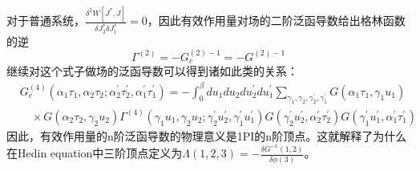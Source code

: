 \documentclass[10pt,openany]{book}
\theoremstyle{thmstyle} %
\theoremstyle{defstyle} %
\theoremstyle{prostyle} %
\begin{document}
对于普通系统，$ \frac{\delta^2 W\left[J^*, J\right]}{\delta J_3^* \delta J_1^*}=0 $，因此有效作用量对场的二阶泛函导数给出格林函数的逆
\begin{equation}
  \Gamma^{(2)}=-G_c^{(2)-1}=-G^{(2)-1}
\end{equation}
继续对这个式子做场的泛函导数可以得到诸如此类的关系：
\begin{equation}
  \begin{aligned}
& G_c^{(4)}\left(\alpha_1 \tau_1, \alpha_2 \tau_2 ; \alpha_2^{\prime} \tau_2^{\prime}, \alpha_1^{\prime} \tau_1^{\prime}\right)=-\int_0^\beta d u_1 d u_2 d u_2^{\prime} d u_1^{\prime} \sum_{\gamma_1, \gamma_2, \gamma_2^{\prime}, \gamma_1^{\prime}} G\left(\alpha_1 \tau_1, \gamma_1 u_1\right) \\
& \quad \times G\left(\alpha_2 \tau_2, \gamma_2 u_2\right) \Gamma^{(4)}\left(\gamma_1 u_1, \gamma_2 u_2 ; \gamma_2^{\prime} u_2^{\prime}, \gamma_1^{\prime} u_1^{\prime}\right) G\left(\gamma_2^{\prime} u_2^{\prime}, \alpha_2^{\prime} \tau_2^{\prime}\right) G\left(\gamma_1^{\prime} u_1^{\prime}, \alpha_1^{\prime} \tau_1^{\prime}\right)
\end{aligned}
\end{equation}
因此，有效作用量的n阶泛函导数的物理意义是1PI的n阶顶点。这就解释了为什么在Hedin equation中三阶顶点定义为$ \Lambda(1,2,3)=-\frac{\delta G^{-1}(1,2)}{\delta \phi(3)} $。\\
\end{document}
